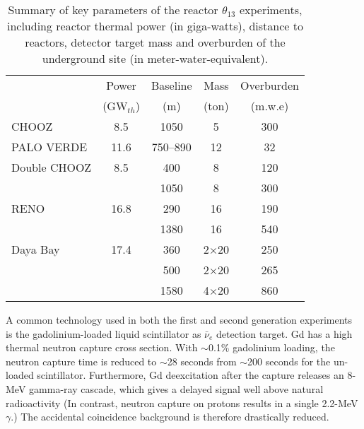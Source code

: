 \begin{table}[!htb]
  \begin{tabular}{lcccc}
  \hline
  & Power & Baseline & Mass & Overburden \\
  & (GW$_{th}$) & (m) & (ton) & (m.w.e)    \\
  \hline
  CHOOZ        & 8.5  & 1050  & 5    & 300\\
  PALO VERDE   & 11.6 & 750--890  & 12  & 32\\
  \hline
  Double CHOOZ & 8.5  & 400  & 8  & 120\\
               &      & 1050 & 8  & 300\\
  RENO         & 16.8 & 290  & 16   & 190\\
               &      & 1380 & 16   & 540\\
  Daya Bay     & 17.4 & 360  & 2$\times$20   & 250\\
               &      & 500  & 2$\times$20   & 265\\
               &      & 1580 & 4$\times$20   & 860\\
  \hline
  \end{tabular}
  \caption{Summary of key parameters of the reactor $\theta_{13}$ experiments, including reactor thermal power (in giga-watts), distance to reactors, detector target mass and overburden of the underground site (in meter-water-equivalent).}
\label{tab:theta13}
\end{table}

A common technology used in both the first and second generation experiments is the gadolinium-loaded liquid scintillator as $\bar\nu_{e}$ detection target. Gd has a high thermal neutron capture cross section. With $\sim$0.1\% gadolinium loading, the neutron capture time is reduced to $\sim$28 seconds from $\sim$200 seconds for the un-loaded scintillator. Furthermore, Gd deexcitation after the capture releases an 8-MeV gamma-ray cascade, which gives a delayed signal well above natural radioactivity (In contrast, neutron capture on protons results in a single 2.2-MeV $\gamma$.) The accidental coincidence background is therefore drastically reduced.

